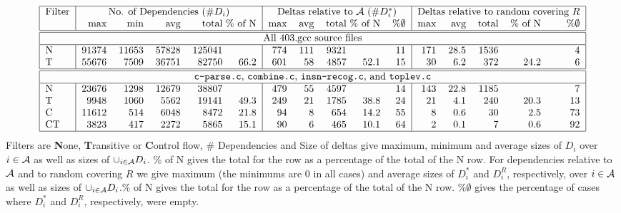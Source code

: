 \documentclass[times, 10pt,twocolumn]{article}
\begin{document}
\begin{table*} \small
\[
\begin{tabular}{|l|rrrr@{\ }r|rrr@{\ }rr|rrrrr|} \hline
Filter & \multicolumn{5}{c|}{No. of Dependencies ($\#D_i$)} 
     & \multicolumn{5}{c|}{Deltas relative to $\cal A$ ($\#D_i^{\ast}$)}
     & \multicolumn{5}{c|}{Deltas relative to random covering $R$} \\
     & max & min & avg & total & \% of N
     & max & avg & total & \% of N & \%$\emptyset$ 
     & max & avg & total & \% of N & \%$\emptyset$ 
     \\ \hline \hline
\multicolumn{16}{|c|}{ All 403.gcc source files } \\ \hline
N & 91374 & 11653 & 57828  & 125041 &  & 774 & 111  & 9321 &  & 11 & 171 & 28.5 & 1536 & & 4 \\
T & 55676 & 7509 & 36751  & 82750 & 66.2  & 601 & 58  & 4857 & 52.1  & 15 & 30 & 6.2 & 372 & 24.2 & 6 \\
\hline \hline
\multicolumn{16}{|c|}{ {\tt c-parse.c}, {\tt combine.c}, 
  {\tt insn-recog.c}, and {\tt toplev.c} } \\
\hline
N & 23676 & 1298 & 12679 & 38807 &      & 479 & 55 & 4597 &      & 14 & 143 & 22.8 & 1185 &      &  7 \\
T &  9948 & 1060 &  5562 & 19141 & 49.3 & 249 & 21 & 1785 & 38.8 & 24 &  21 &  4.1 &  240 & 20.3 & 13 \\
C & 11612 &  514 &  6048 &  8472 & 21.8 &  94 &  8 &  654 & 14.2 & 55 &   8 &  0.6 &   30 &  2.5 & 73 \\
CT & 3823 &  417 &  2272 &  5865 & 15.1 &  90 &  6 &  465 & 10.1 & 64 &   2 &  0.1 &    7 &  0.6 & 92 \\
\hline
\end{tabular}
\]
Filters are {\bf N}one, {\bf T}ransitive or {\bf C}ontrol flow, \# Dependencies and Size of deltas
give maximum, minimum and average sizes of $D_i$ over $i\in \cal A$
as well as sizes of $\cup_{i \in \cal A} D_i$. \% of N gives 
the total for the row as a percentage of the total of the N row. 
For dependencies relative to $\cal A$ and to random covering $R$ we give 
maximum (the minimums are 0 in all cases) and average sizes of $D_i^{\ast}$ and $D_i^R$, respectively,
 over $i\in \cal A$
as well as sizes of $\cup_{i \in \cal A} D_i$.\% of N gives 
the total for the row as a percentage of the total of the N row. $\%\emptyset$ gives the percentage
of cases where $D_i^{\ast}$ and $D_i^R$, respectively, were empty.
\caption{Dependence statistics} \label{tdepstat}
\end{table*}
\end{document}
